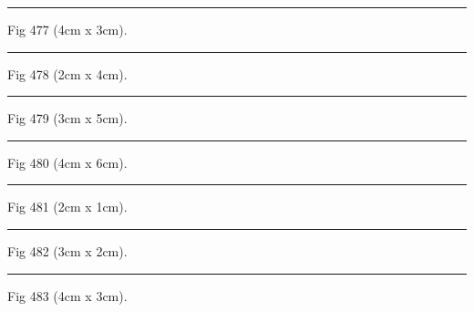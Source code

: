 \documentclass[a4paper,11pt]{article}
\begin{document}
\begin{swarmwrap}%
  \begin{minipage}[t]{4cm}
    \centering
    \rule{\linewidth}{3cm}
    {\footnotesize Fig 477 (4cm x 3cm).}
  \end{minipage}%
\end{swarmwrap}%
\swarmwrapnext
\lipsum[27]%

\begin{swarmwrap}%
  \begin{minipage}[t]{2cm}
    \centering
    \rule{\linewidth}{4cm}
    {\footnotesize Fig 478 (2cm x 4cm).}
  \end{minipage}%
\end{swarmwrap}%
\swarmwrapnext
\lipsum[28]%

\begin{swarmwrap}%
  \begin{minipage}[t]{3cm}
    \centering
    \rule{\linewidth}{5cm}
    {\footnotesize Fig 479 (3cm x 5cm).}
  \end{minipage}%
\end{swarmwrap}%
\swarmwrapnext
\lipsum[29]%

\begin{swarmwrap}%
  \begin{minipage}[t]{4cm}
    \centering
    \rule{\linewidth}{6cm}
    {\footnotesize Fig 480 (4cm x 6cm).}
  \end{minipage}%
\end{swarmwrap}%
\swarmwrapnext
\lipsum[30]%

\begin{swarmwrap}%
  \begin{minipage}[t]{2cm}
    \centering
    \rule{\linewidth}{1cm}
    {\footnotesize Fig 481 (2cm x 1cm).}
  \end{minipage}%
\end{swarmwrap}%
\swarmwrapnext
\lipsum[31]%

\begin{swarmwrap}%
  \begin{minipage}[t]{3cm}
    \centering
    \rule{\linewidth}{2cm}
    {\footnotesize Fig 482 (3cm x 2cm).}
  \end{minipage}%
\end{swarmwrap}%
\swarmwrapnext
\lipsum[32]%

\begin{swarmwrap}%
  \begin{minipage}[t]{4cm}
    \centering
    \rule{\linewidth}{3cm}
    {\footnotesize Fig 483 (4cm x 3cm).}
  \end{minipage}%
\end{swarmwrap}%
\swarmwrapnext
\lipsum[33]%
\end{document}
